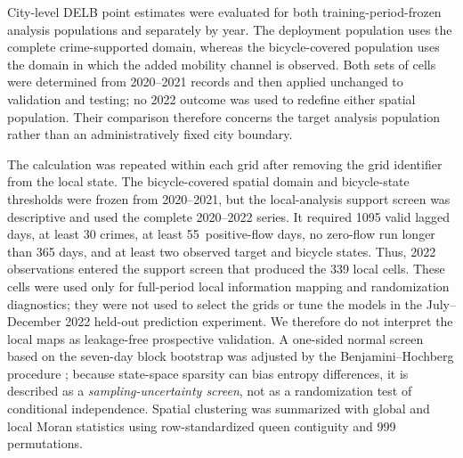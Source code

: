 \documentclass[applsci,article,accept,moreauthors]{Definitions/mdpi}
\newcommand{\TotalEligibleLocalGrids}{339}
\begin{document}
City-level DELB point estimates were evaluated for both training-period-frozen
analysis populations and separately by year. The deployment population uses
the complete crime-supported domain, whereas the bicycle-covered population
uses the domain in
which the added mobility channel is observed. Both sets of cells were determined
from 2020--2021 records and then applied unchanged to validation and
testing; no 2022 outcome was used to redefine either spatial population.
Their comparison therefore concerns the target analysis population rather
than an administratively fixed city boundary.


The calculation was repeated within each grid after removing the grid
identifier from the local state. {The bicycle-covered spatial domain and
bicycle-state thresholds were frozen from 2020--2021, but the local-analysis
support screen was descriptive and used the complete 2020--2022 series. It
required 1095 valid lagged days, at least 30 crimes, at least 55~positive-flow
days, no zero-flow run longer than 365 days, and at least two observed target
and bicycle states. Thus, 2022 observations entered the support screen that
produced the \TotalEligibleLocalGrids{} local cells. These cells were used
only for full-period local information mapping and randomization diagnostics;
they were not used to select the grids or tune the models in the
July--December 2022 held-out prediction experiment. We therefore do not
interpret the local maps as leakage-free prospective validation.} A one-sided
normal screen based on the seven-day block bootstrap was adjusted by the
Benjamini--Hochberg procedure \citep{benjamini1995}; because state-space
sparsity can bias entropy differences, it is described as a
\emph{sampling-uncertainty screen}, not as a randomization test of
conditional independence. Spatial clustering was summarized with global
and local Moran statistics \citep{moran1950} using row-standardized queen
contiguity and 999 permutations.
\end{document}
